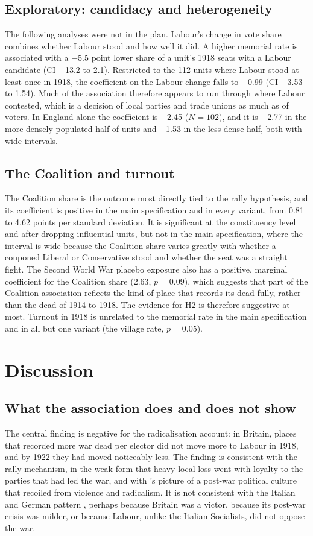 \documentclass[11pt,a4paper]{article}
\begin{document}
\subsection{Exploratory: candidacy and heterogeneity}
The following analyses were not in the plan. Labour's change in vote share combines whether Labour stood and how well it did. A higher memorial rate is associated with a $-$5.5 point lower share of a unit's 1918 seats with a Labour candidate (CI $-$13.2 to 2.1). Restricted to the 112 units where Labour stood at least once in 1918, the coefficient on the Labour change falls to $-$0.99 (CI $-$3.53 to 1.54). Much of the association therefore appears to run through where Labour contested, which is a decision of local parties and trade unions as much as of voters. In England alone the coefficient is $-$2.45 ($N=102$), and it is $-$2.77 in the more densely populated half of units and $-$1.53 in the less dense half, both with wide intervals.

\subsection{The Coalition and turnout}
The Coalition share is the outcome most directly tied to the rally hypothesis, and its coefficient is positive in the main specification and in every variant, from 0.81 to 4.62 points per standard deviation. It is significant at the constituency level and after dropping influential units, but not in the main specification, where the interval is wide because the Coalition share varies greatly with whether a couponed Liberal or Conservative stood and whether the seat was a straight fight. The Second World War placebo exposure also has a positive, marginal coefficient for the Coalition share (2.63, $p=0.09$), which suggests that part of the Coalition association reflects the kind of place that records its dead fully, rather than the dead of 1914 to 1918. The evidence for H2 is therefore suggestive at most. Turnout in 1918 is unrelated to the memorial rate in the main specification and in all but one variant (the village rate, $p=0.05$).

\section{Discussion}\label{sec:disc}
\subsection{What the association does and does not show}
The central finding is negative for the radicalisation account: in Britain, places that recorded more war dead per elector did not move more to Labour in 1918, and by 1922 they had moved noticeably less. The finding is consistent with the rally mechanism, in the weak form that heavy local loss went with loyalty to the parties that had led the war, and with \citet{lawrence2003}'s picture of a post-war political culture that recoiled from violence and radicalism. It is not consistent with the Italian and German pattern \citep{acemoglu2022,dejuan2024}, perhaps because Britain was a victor, because its post-war crisis was milder, or because Labour, unlike the Italian Socialists, did not oppose the war.
\end{document}
